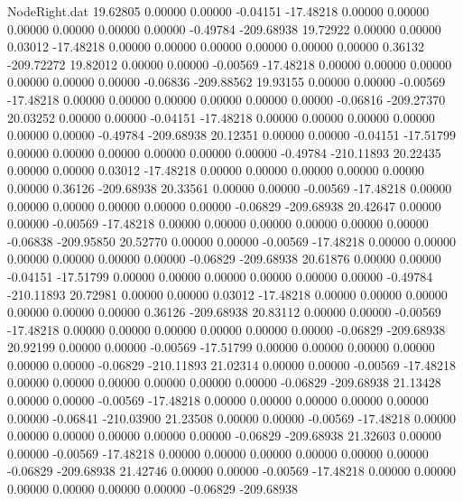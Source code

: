 \begin{filecontents}{NodeRight.dat}
  19.62805    0.00000    0.00000    -0.04151  -17.48218    0.00000    0.00000    0.00000    0.00000    0.00000    0.00000   -0.49784 -209.68938
  19.72922    0.00000    0.00000     0.03012  -17.48218    0.00000    0.00000    0.00000    0.00000    0.00000    0.00000    0.36132 -209.72272
  19.82012    0.00000    0.00000    -0.00569  -17.48218    0.00000    0.00000    0.00000    0.00000    0.00000    0.00000   -0.06836 -209.88562
  19.93155    0.00000    0.00000    -0.00569  -17.48218    0.00000    0.00000    0.00000    0.00000    0.00000    0.00000   -0.06816 -209.27370
  20.03252    0.00000    0.00000    -0.04151  -17.48218    0.00000    0.00000    0.00000    0.00000    0.00000    0.00000   -0.49784 -209.68938
  20.12351    0.00000    0.00000    -0.04151  -17.51799    0.00000    0.00000    0.00000    0.00000    0.00000    0.00000   -0.49784 -210.11893
  20.22435    0.00000    0.00000     0.03012  -17.48218    0.00000    0.00000    0.00000    0.00000    0.00000    0.00000    0.36126 -209.68938
  20.33561    0.00000    0.00000    -0.00569  -17.48218    0.00000    0.00000    0.00000    0.00000    0.00000    0.00000   -0.06829 -209.68938
  20.42647    0.00000    0.00000    -0.00569  -17.48218    0.00000    0.00000    0.00000    0.00000    0.00000    0.00000   -0.06838 -209.95850
  20.52770    0.00000    0.00000    -0.00569  -17.48218    0.00000    0.00000    0.00000    0.00000    0.00000    0.00000   -0.06829 -209.68938
  20.61876    0.00000    0.00000    -0.04151  -17.51799    0.00000    0.00000    0.00000    0.00000    0.00000    0.00000   -0.49784 -210.11893
  20.72981    0.00000    0.00000     0.03012  -17.48218    0.00000    0.00000    0.00000    0.00000    0.00000    0.00000    0.36126 -209.68938
  20.83112    0.00000    0.00000    -0.00569  -17.48218    0.00000    0.00000    0.00000    0.00000    0.00000    0.00000   -0.06829 -209.68938
  20.92199    0.00000    0.00000    -0.00569  -17.51799    0.00000    0.00000    0.00000    0.00000    0.00000    0.00000   -0.06829 -210.11893
  21.02314    0.00000    0.00000    -0.00569  -17.48218    0.00000    0.00000    0.00000    0.00000    0.00000    0.00000   -0.06829 -209.68938
  21.13428    0.00000    0.00000    -0.00569  -17.48218    0.00000    0.00000    0.00000    0.00000    0.00000    0.00000   -0.06841 -210.03900
  21.23508    0.00000    0.00000    -0.00569  -17.48218    0.00000    0.00000    0.00000    0.00000    0.00000    0.00000   -0.06829 -209.68938
  21.32603    0.00000    0.00000    -0.00569  -17.48218    0.00000    0.00000    0.00000    0.00000    0.00000    0.00000   -0.06829 -209.68938
  21.42746    0.00000    0.00000    -0.00569  -17.48218    0.00000    0.00000    0.00000    0.00000    0.00000    0.00000   -0.06829 -209.68938

\end{filecontents}
